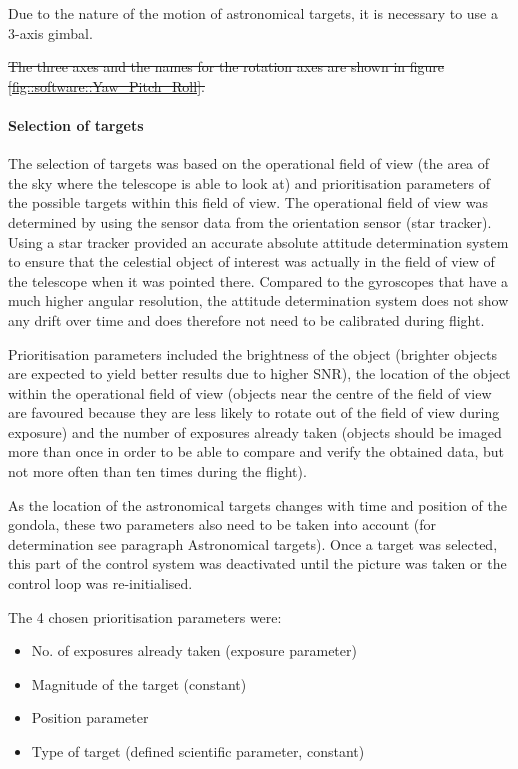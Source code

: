 Due to the nature of the motion of astronomical targets, it is necessary to use a 3-axis gimbal.

\st{The three axes and the names for the rotation axes are shown in figure \mbox{\ref{fig::software::Yaw_Pitch_Roll}}.}

\paragraph{Selection of targets}

The selection of targets was based on the operational field of view (the area of the sky where the telescope is able to look at) and prioritisation parameters of the possible targets within this field of view. The operational field of view was determined by using the sensor data from the orientation sensor (star tracker). Using a star tracker provided an accurate absolute attitude determination system to ensure that the celestial object of interest was actually in the field of view of the telescope when it was pointed there. Compared to the gyroscopes that have a much higher angular resolution, the attitude determination system does not show any drift over time and does therefore not need to be calibrated during flight.

Prioritisation parameters included the brightness of the object (brighter objects are expected to yield better results due to higher SNR), the location of the object within the operational field of view (objects near the centre of the field of view are favoured because they are less likely to rotate out of the field of view during exposure) and the number of exposures already taken (objects should be imaged more than once in order to be able to compare and verify the obtained data, but not more often than ten times during the flight). 

As the location of the astronomical targets changes with time and position of the gondola, these two parameters also need to be taken into account (for determination see paragraph Astronomical targets). Once a target was selected, this part of the control system was deactivated until the picture was taken or the control loop was re-initialised.

The 4 chosen prioritisation parameters were:
\begin{itemize}
    \item No. of exposures already taken (exposure parameter)
    \item Magnitude of the target (constant)
    \item Position parameter
    \item Type of target  (defined scientific parameter, constant)
\end{itemize}


